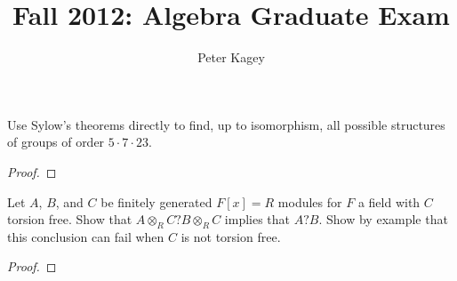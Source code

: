 \documentclass{article}
\newenvironment{problem}[2][Problem]{\begin{trivlist}
\item[\hskip \labelsep {\bfseries #1}\hskip \labelsep {\bfseries #2.}]}{\end{trivlist}}
\begin{document}
\title{Fall 2012: Algebra Graduate Exam}
\author{Peter Kagey}

\maketitle

\begin{problem}{1}
  Use Sylow's theorems directly to find, up to isomorphism, all possible structures of groups of order $5\cdot7\cdot23$.
\end{problem}

\begin{proof}
\end{proof}
\pagebreak

\begin{problem}{2}
  Let $A$, $B$, and $C$ be finitely generated $F[x] = R$ modules for $F$ a field with $C$ torsion free. Show that $A \otimes_R C ? B \otimes_R C$ implies that $A ? B$.
  Show by example that this conclusion can fail when $C$ is not torsion free.
\end{problem}

\begin{proof}
\end{proof}
\end{document}
